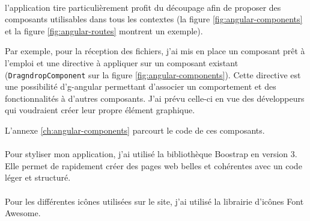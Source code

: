 \paragraph{}
l'application tire particulièrement profit du découpage afin de proposer des composants utilisables dans tous les contextes (la figure \ref{fig:angular-components} et la figure \ref{fig:angular-routes} montrent un exemple).

Par exemple, pour la réception des fichiers, j'ai mis en place un composant prêt à l'emploi et une directive à appliquer sur un composant existant (\lstinline{DragndropComponent} sur la figure \ref{fig:angular-components}).
Cette directive est une possibilité d'\Gls{g-angular} permettant d'associer un comportement et des fonctionnalités à d'autres composants.
J'ai prévu celle-ci en vue des développeurs qui voudraient créer leur propre élément graphique.

L'annexe \ref{ch:angular-components} parcourt le code de ces composants.

\paragraph{}
Pour styliser mon application, j'ai utilisé la bibliothèque Boostrap en version 3.
Elle permet de rapidement créer des pages web belles et cohérentes avec un code léger et structuré.

\paragraph{}
Pour les différentes icônes utilisées sur le site, j'ai utilisé la librairie d'icônes Font Awesome.